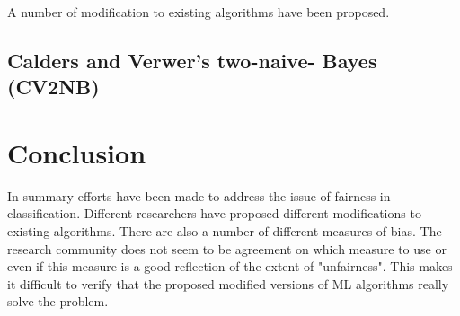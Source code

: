 \documentclass[a4paper, 12pt, titlepage]{article}
\begin{document}
A number of modification to existing algorithms have been proposed.

\subsection*{Calders and Verwer's two-naive- Bayes (CV2NB)}

\section*{Conclusion}

In summary efforts have been made to address the issue of fairness in classification. Different researchers have proposed different modifications to existing algorithms. There are also a number of different measures of bias. The research community does not seem to be agreement on which measure to use or even if this measure is a good reflection of the extent of "unfairness". This makes it difficult to verify that the proposed modified versions of ML algorithms really solve the problem.
\end{document}

